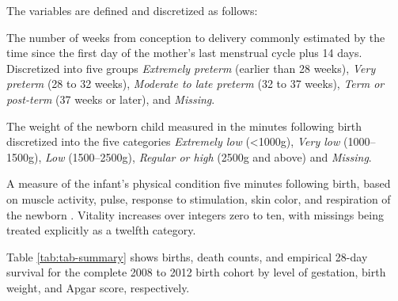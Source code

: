 \documentclass[10pt,twoside,reqno]{article}
\providecommand{\tightlist}{%
  \setlength{\topsep}{0pt}
  \setlength{\partopsep}{0pt}
  \setlength{\itemsep}{0pt}
  \setlength{\parsep}{.9\parskip}
}
\begin{document}
The variables are defined and discretized as follows:

\begin{description}
\tightlist
\item[Gestation at delivery alias prematurity]
The number of weeks from conception to delivery commonly estimated by the time since the first day of the mother's last menstrual cycle plus 14 days. Discretized into five groups \emph{Extremely preterm} (earlier than 28 weeks), \emph{Very preterm} (28 to 32 weeks), \emph{Moderate to late preterm} (32 to 37 weeks), \emph{Term or post-term} (37 weeks or later), and \emph{Missing}.
\item[Birth weight]
The weight of the newborn child measured in the minutes following birth discretized into the five categories \emph{Extremely low} (\textless1000g), \emph{Very low} (1000--1500g), \emph{Low} (1500--2500g), \emph{Regular or high} (2500g and above) and \emph{Missing}.
\item[5 minute Apgar score]
A measure of the infant's physical condition five minutes following birth, based on muscle activity, pulse, response to stimulation, skin color, and respiration of the newborn \citep{Apgar1953}. Vitality increases over integers zero to ten, with missings being treated explicitly as a twelfth category.
\end{description}

Table \ref{tab:tab-summary} shows births, death counts, and empirical 28-day survival for the complete 2008 to 2012 birth cohort by level of gestation, birth weight, and Apgar score, respectively.
\end{document}
